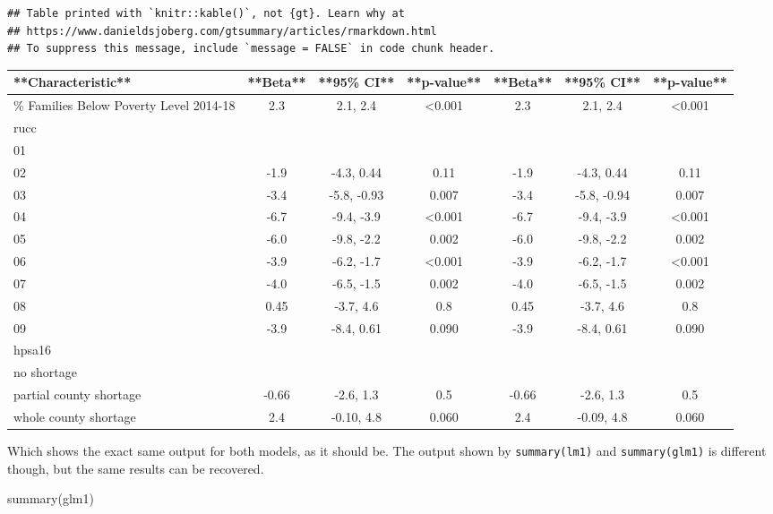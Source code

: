 \documentclass[
]{article}
\newenvironment{Shaded}{\begin{snugshade}}{\end{snugshade}}
\newcommand{\FunctionTok}[1]{\textcolor[rgb]{0.00,0.00,0.00}{#1}}
\newcommand{\NormalTok}[1]{#1}
\begin{document}
\begin{verbatim}
## Table printed with `knitr::kable()`, not {gt}. Learn why at
## https://www.danieldsjoberg.com/gtsummary/articles/rmarkdown.html
## To suppress this message, include `message = FALSE` in code chunk header.
\end{verbatim}

\begin{tabular}{l|c|c|c|c|c|c}
\hline
**Characteristic** & **Beta** & **95\% CI** & **p-value** & **Beta** & **95\% CI** & **p-value**\\
\hline
\% Families Below Poverty Level 2014-18 & 2.3 & 2.1, 2.4 & <0.001 & 2.3 & 2.1, 2.4 & <0.001\\
\hline
rucc &  &  &  &  &  & \\
\hline
01 &  &  &  &  &  & \\
\hline
02 & -1.9 & -4.3, 0.44 & 0.11 & -1.9 & -4.3, 0.44 & 0.11\\
\hline
03 & -3.4 & -5.8, -0.93 & 0.007 & -3.4 & -5.8, -0.94 & 0.007\\
\hline
04 & -6.7 & -9.4, -3.9 & <0.001 & -6.7 & -9.4, -3.9 & <0.001\\
\hline
05 & -6.0 & -9.8, -2.2 & 0.002 & -6.0 & -9.8, -2.2 & 0.002\\
\hline
06 & -3.9 & -6.2, -1.7 & <0.001 & -3.9 & -6.2, -1.7 & <0.001\\
\hline
07 & -4.0 & -6.5, -1.5 & 0.002 & -4.0 & -6.5, -1.5 & 0.002\\
\hline
08 & 0.45 & -3.7, 4.6 & 0.8 & 0.45 & -3.7, 4.6 & 0.8\\
\hline
09 & -3.9 & -8.4, 0.61 & 0.090 & -3.9 & -8.4, 0.61 & 0.090\\
\hline
hpsa16 &  &  &  &  &  & \\
\hline
no shortage &  &  &  &  &  & \\
\hline
partial county shortage & -0.66 & -2.6, 1.3 & 0.5 & -0.66 & -2.6, 1.3 & 0.5\\
\hline
whole county shortage & 2.4 & -0.10, 4.8 & 0.060 & 2.4 & -0.09, 4.8 & 0.060\\
\hline
\end{tabular}

Which shows the exact same output for both models, as it should be. The output shown by \texttt{summary(lm1)} and \texttt{summary(glm1)} is different though, but the same results can be recovered.

\begin{Shaded}
\begin{Highlighting}[]
\FunctionTok{summary}\NormalTok{(glm1)}
\end{Highlighting}
\end{Shaded}
\end{document}
